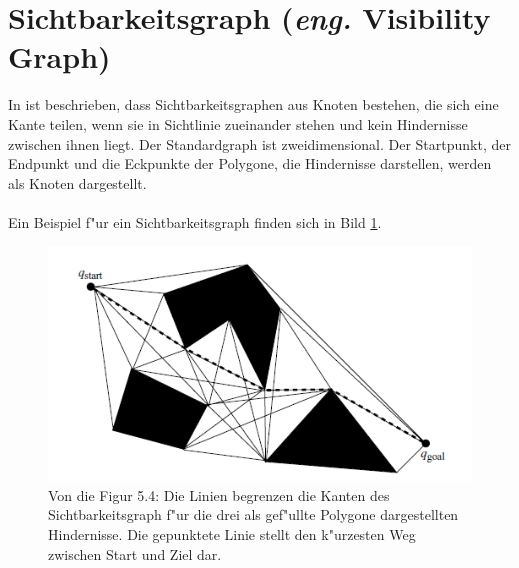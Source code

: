 \section{Sichtbarkeitsgraph (\textit{eng.} Visibility Graph)}
%
%
In \cite{Principles:05} ist beschrieben, dass Sichtbarkeitsgraphen aus Knoten bestehen, die sich eine Kante teilen, wenn sie in Sichtlinie zueinander stehen und kein Hindernisse zwischen ihnen liegt. Der Standardgraph ist zweidimensional. Der Startpunkt, der Endpunkt und die Eckpunkte der Polygone, die Hindernisse darstellen, werden als Knoten dargestellt.
\\\\
Ein Beispiel f"ur ein Sichtbarkeitsgraph finden sich in Bild \ref{sec3a}.
\begin{figure} %
	\centering
	\includegraphics[width=\textwidth]{images/Robot_Motion_Visibility_Graph.png}
	\caption{Von \cite[~S. 111]{Principles:05} die Figur 5.4: Die Linien begrenzen die Kanten des Sichtbarkeitsgraph f"ur die drei als gef"ullte Polygone dargestellten Hindernisse. Die gepunktete Linie stellt den k"urzesten Weg zwischen Start und Ziel dar.}
	\label{sec3a}
\end{figure}


